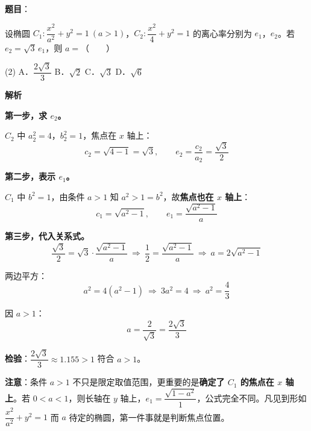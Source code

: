 \begin{answer}

\textbf{题目}：

设椭圆 $C_1:\dfrac{x^{2}}{a^{2}}+y^{2}=1\ (a>1)$，$C_2:\dfrac{x^{2}}4+y^{2}=1$ 的离心率分别为 $e_1$，$e_2$。若 $e_2=\sqrt3\,e_1$，则 $a=$\mbox{（　　）}

\begin{gkopts}(2)
\task A．$\dfrac{2\sqrt3}3$
\task B．$\sqrt2$
\task C．$\sqrt3$
\task D．$\sqrt6$
\end{gkopts}

\textbf{解析}

\textbf{第一步，求 $e_2$。}

$C_2$ 中 $a_2^{2}=4$，$b_2^{2}=1$，焦点在 $x$ 轴上：
\nopagebreak[4]
\[c_2=\sqrt{4-1}=\sqrt3,\qquad e_2=\frac{c_2}{a_2}=\frac{\sqrt3}2\]

\textbf{第二步，表示 $e_1$。}

$C_1$ 中 $b^{2}=1$，由条件 $a>1$ 知 $a^{2}>1=b^{2}$，故\textbf{焦点也在 $x$ 轴上}：
\nopagebreak[4]
\[c_1=\sqrt{a^{2}-1},\qquad e_1=\frac{\sqrt{a^{2}-1}}a\]

\textbf{第三步，代入关系式。}
\nopagebreak[4]
\[\frac{\sqrt3}2=\sqrt3\cdot\frac{\sqrt{a^{2}-1}}a\ \Longrightarrow\ \frac12=\frac{\sqrt{a^{2}-1}}a\ \Longrightarrow\ a=2\sqrt{a^{2}-1}\]

两边平方：
\nopagebreak[4]
\[a^{2}=4\left(a^{2}-1\right)\ \Longrightarrow\ 3a^{2}=4\ \Longrightarrow\ a^{2}=\frac43\]

因 $a>1$：
\nopagebreak[4]
\[a=\frac2{\sqrt3}=\frac{2\sqrt3}3\]

\textbf{检验}：$\dfrac{2\sqrt3}3\approx1.155>1$  符合 $a>1$。

\begin{gktip}
\textbf{注意}：条件 $a>1$ 不只是限定取值范围，更重要的是\textbf{确定了 $C_1$ 的焦点在 $x$ 轴上}。若 $0<a<1$，则长轴在 $y$ 轴上，$e_1=\dfrac{\sqrt{1-a^{2}}}1$，公式完全不同。凡见到形如 $\dfrac{x^2}{a^2}+y^2=1$ 而 $a$ 待定的椭圆，第一件事就是判断焦点位置。
\end{gktip}


\par\medskip

\end{answer}
